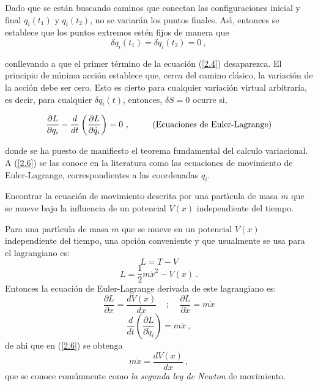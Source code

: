 Dado que se están buscando caminos que conectan las configuraciones inicial y final $q_{i}(t_{1})$ y $q_{i}(t_{2})$, no se variar\'{a}n los puntos
finales. As\'{\i}, entonces se establece que los puntos extremos estén fijos de manera que
\begin{equation}
\delta q_{i}(t_{1})=\delta q_{i}(t_{2})=0~,  \label{2.5}
\end{equation}

conllevando a que el primer t\'{e}rmino de la ecuaci\'{o}n (\ref{2.4}) desaparezca. El principio de m\'{\i}nima acci\'{o}n establece que, cerca del camino cl\'{a}sico, la variaci\'{o}n de la acci\'{o}n debe ser cero. Esto es cierto para cualquier variaci\'{o}n virtual arbitraria, es decir, para 
cualquier $\delta q_{i}(t)$, entonces, $\delta S=0$ ocurre si,

\begin{equation}
\frac{\partial L}{\partial q_{i}}-\frac{d}{dt}\left( \frac{\partial L}{%
\partial \dot{q}_{i}}\right) =0~, ~~~~~~~~\text{(Ecuaciones de Euler-Lagrange)}   \label{2.6}
\end{equation}

\vspace{0.1cm}
donde se ha puesto de manifiesto el teorema fundamental del calculo variacional. A (\ref{2.6}) se las conoce en la literatura como las
ecuaciones de movimiento de Euler-Lagrange, correspondientes a las coordenadas $q_{i}$.\\


\begin{exercise}
Encontrar la ecuaci\'{o}n de movimiento descrita por una part\'{\i}cula de
masa $m$ que se mueve bajo la influencia de un potencial $V\left( x\right) $
independiente del tiempo.\\
\end{exercise}
\begin{solution}
Para una part\'{\i}cula de masa $m$ que se mueve en un potencial $V(x)$
independiente del tiempo, una opci\'{o}n conveniente y que usualmente se usa
para el lagrangiano es:%
\begin{equation*}
L=T-V
\end{equation*}%
\begin{equation}
L=\frac{1}{2}m\dot{x}^{2}-V\left( x\right) ~.  \label{2.7}
\end{equation}%
Entonces la ecuaci\'{o}n de Euler-Lagrange derivada de este lagrangiano es:%
\begin{equation*}
\frac{\partial L}{\partial x}=\frac{dV\left( x\right) }{dx}~\ \ \ \ ;~\ \ \
\ \frac{\partial L}{\partial \dot{x}}=m\dot{x}
\end{equation*}%
\begin{equation*}
\frac{d}{dt}\left( \frac{\partial L}{\partial \dot{q}_{i}}\right) =m\ddot{x}~,
\end{equation*}%
de ahi que en (\ref{2.6}) se obtenga%
\begin{equation}
m\ddot{x}=\frac{dV\left( x\right) }{dx}~,  \label{2.8}
\end{equation}%
que se conoce com\'{u}nmente como \emph{la segunda ley de Newton} de
movimiento.
\end{solution}

